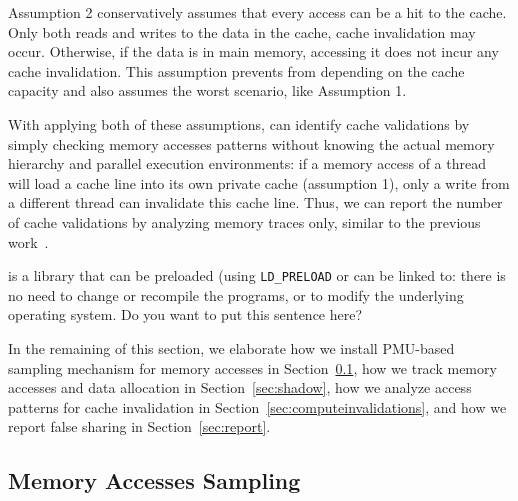 Assumption 2 conservatively assumes that every access can be a hit to the cache. Only both reads and writes to the data in the cache, cache invalidation may occur. Otherwise, if the data is in main memory, accessing it does not incur any cache invalidation. This assumption prevents \cheetah{} from depending on the cache capacity and also assumes the worst scenario, like Assumption 1.

With applying both of these assumptions, \cheetah{} can identify cache validations by simply checking memory accesses patterns without knowing the actual memory hierarchy and parallel execution environments: if a memory access of a thread will load a cache line into its own private cache (assumption 1), only a write from a different thread can invalidate this cache line. Thus, we can report the number of cache validations by analyzing memory traces only, similar to the previous work~\cite{Predator, qinzhao}. 

{\color{red}\Cheetah{} is a library that can be preloaded (using \texttt{LD\_PRELOAD} or can be linked to: there is no need to change or recompile the programs, or to modify the underlying operating system. } {\color{blue} Do you want to put this sentence here?}

In the remaining of this section, we elaborate how we install PMU-based sampling mechanism for memory accesses in Section~\ref{sec:perfcounter}, how we track memory accesses and data allocation in Section~\ref{sec:shadow}, how we analyze access patterns for cache invalidation in Section~\ref{sec:computeinvalidations}, and how we report false sharing in Section~\ref{sec:report}.


\subsection{Memory Accesses Sampling}
\label{sec:perfcounter}


